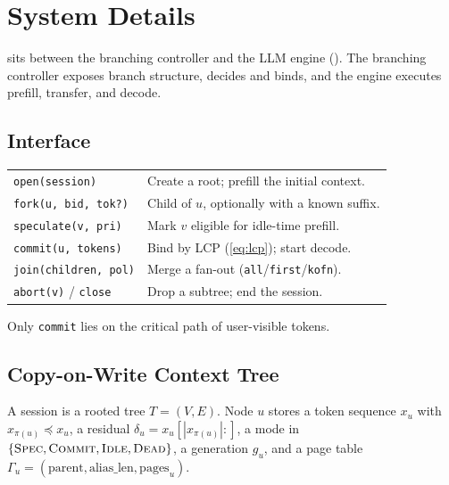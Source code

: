 \section{System Details}
\label{sec:design-full}

\sys sits between the branching controller and the LLM engine ().
The branching controller exposes branch structure, \sys decides and binds, and the engine executes prefill, transfer, and decode.

\subsection{Interface}
\label{sec:overview}
\begin{center}
\footnotesize
\setlength{\tabcolsep}{3pt}
\begin{tabular}{@{}lp{}@{}}
\toprule
\texttt{open(session)} & Create a root; prefill the initial context. \\
\texttt{fork(u, bid, tok?)} & Child of $u$, optionally with a known suffix. \\
\texttt{speculate(v, pri)} & Mark $v$ eligible for idle-time prefill. \\
\texttt{commit(u, tokens)} & Bind by LCP (\eqref{eq:lcp}); start decode. \\
\texttt{join(children, pol)} & Merge a fan-out (\texttt{all}/\texttt{first}/\texttt{kofn}). \\
\texttt{abort(v)} / \texttt{close} & Drop a subtree; end the session. \\
\bottomrule
\end{tabular}
\end{center}
Only \texttt{commit} lies on the critical path of user-visible tokens.

\subsection{Copy-on-Write Context Tree}
\label{sec:state}

\begin{definition}
A session is a rooted tree $T=(V,E)$.
Node $u$ stores a token sequence $x_u$ with $x_{\pi(u)}\preceq x_u$, a residual $\delta_u=x_u[|x_{\pi(u)}|{:}]$, a mode in $\{\textsc{Spec},\textsc{Commit},\textsc{Idle},\textsc{Dead}\}$, a generation $g_u$, and a page table $\Gamma_u=(\mathrm{parent},\mathrm{alias\_len},\mathrm{pages}_u)$.
\end{definition}

